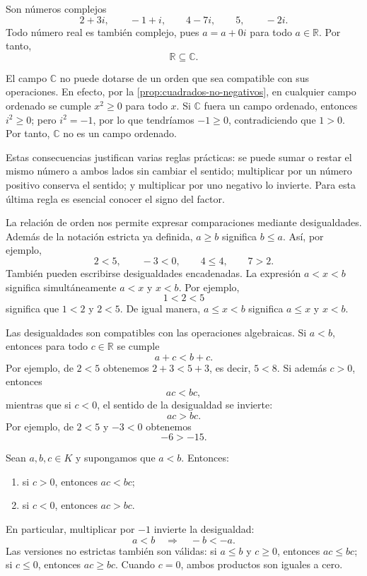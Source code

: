 \begin{example}
Son números complejos
\[
2+3i,\qquad -1+i,\qquad 4-7i,\qquad 5,\qquad -2i.
\]
Todo número real es también complejo, pues $a=a+0i$ para todo $a\in\mathbb{R}$. Por tanto,
\[
\mathbb{R}\subseteq\mathbb{C}.
\]
\end{example}

\begin{example}
El campo $\mathbb{C}$ no puede dotarse de un orden que sea compatible con sus operaciones. En efecto, por la \cref{prop:cuadrados-no-negativos}, en cualquier campo ordenado se cumple $x^2\geq0$ para todo $x$. Si $\mathbb{C}$ fuera un campo ordenado, entonces $i^2\geq0$; pero $i^2=-1$, por lo que tendríamos $-1\geq0$, contradiciendo que $1>0$. Por tanto, $\mathbb{C}$ no es un campo ordenado.
\end{example}

Estas consecuencias justifican varias reglas prácticas: se puede sumar o restar el mismo número a ambos lados sin cambiar el sentido; multiplicar por un número positivo conserva el sentido; y multiplicar por uno negativo lo invierte. Para esta última regla es esencial conocer el signo del factor.

La relación de orden nos permite expresar comparaciones mediante desigualdades. Además de la notación estricta ya definida, $a\geq b$ significa $b\leq a$. Así, por ejemplo,
\[
2<5,\qquad -3<0,\qquad 4\leq4,\qquad 7>2.
\]
También pueden escribirse desigualdades encadenadas. La expresión $a<x<b$ significa simultáneamente $a<x$ y $x<b$. Por ejemplo,
\[
1<2<5
\]
significa que $1<2$ y $2<5$. De igual manera, $a\leq x<b$ significa $a\leq x$ y $x<b$.

Las desigualdades son compatibles con las operaciones algebraicas. Si $a<b$, entonces para todo $c\in\mathbb{R}$ se cumple
\[
a+c<b+c.
\]
Por ejemplo, de $2<5$ obtenemos $2+3<5+3$, es decir, $5<8$. Si además $c>0$, entonces
\[
ac<bc,
\]
mientras que si $c<0$, el sentido de la desigualdad se invierte:
\[
ac>bc.
\]
Por ejemplo, de $2<5$ y $-3<0$ obtenemos
\[
-6>-15.
\]

\begin{samepage}
\begin{proposition}
\label{prop:multiplicacion-orden}
Sean $a,b,c\in K$ y supongamos que $a<b$. Entonces:
\begin{enumerate}
    \item si $c>0$, entonces $ac<bc$;
    \item si $c<0$, entonces $ac>bc$.
\end{enumerate}
En particular, multiplicar por $-1$ invierte la desigualdad:
\[
a<b\quad\Longrightarrow\quad -b<-a.
\]
Las versiones no estrictas también son válidas: si $a\leq b$ y $c\geq0$, entonces $ac\leq bc$; si $c\leq0$, entonces $ac\geq bc$. Cuando $c=0$, ambos productos son iguales a cero.
\end{proposition}
\end{samepage}

